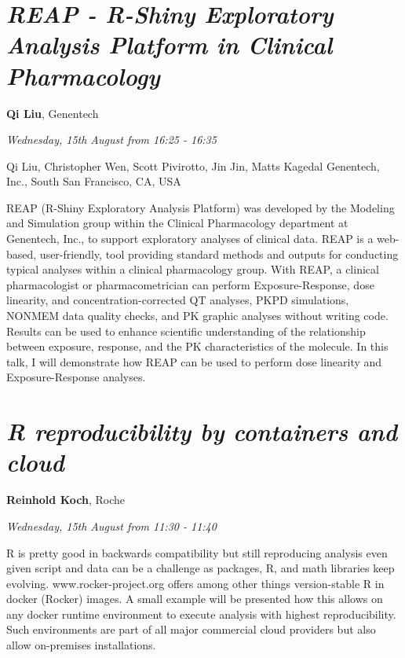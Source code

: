 \documentclass[]{book}
\theoremstyle{definition}
\theoremstyle{definition}
\theoremstyle{definition}
\theoremstyle{remark}
\begin{document}
\hypertarget{reap---r-shiny-exploratory-analysis-platform-in-clinical-pharmacology}{%
\section{\texorpdfstring{\emph{REAP - R-Shiny Exploratory Analysis
Platform in Clinical
Pharmacology}}{REAP - R-Shiny Exploratory Analysis Platform in Clinical Pharmacology}}\label{reap---r-shiny-exploratory-analysis-platform-in-clinical-pharmacology}}

\textbf{Qi Liu}, Genentech

\emph{Wednesday, 15th August from 16:25 - 16:35}

Qi Liu, Christopher Wen, Scott Pivirotto, Jin Jin, Matts Kagedal
Genentech, Inc., South San Francisco, CA, USA

REAP (R-Shiny Exploratory Analysis Platform) was developed by the
Modeling and Simulation group within the Clinical Pharmacology
department at Genentech, Inc., to support exploratory analyses of
clinical data. REAP is a web-based, user-friendly, tool providing
standard methods and outputs for conducting typical analyses within a
clinical pharmacology group. With REAP, a clinical pharmacologist or
pharmacometrician can perform Exposure-Response, dose linearity, and
concentration-corrected QT analyses, PKPD simulations, NONMEM data
quality checks, and PK graphic analyses without writing code. Results
can be used to enhance scientific understanding of the relationship
between exposure, response, and the PK characteristics of the molecule.
In this talk, I will demonstrate how REAP can be used to perform dose
linearity and Exposure-Response analyses.

\hypertarget{r-reproducibility-by-containers-and-cloud}{%
\section{\texorpdfstring{\emph{R reproducibility by containers and
cloud}}{R reproducibility by containers and cloud}}\label{r-reproducibility-by-containers-and-cloud}}

\textbf{Reinhold Koch}, Roche

\emph{Wednesday, 15th August from 11:30 - 11:40}

R is pretty good in backwards compatibility but still reproducing
analysis even given script and data can be a challenge as packages, R,
and math libraries keep evolving. www.rocker-project.org offers among
other things version-stable R in docker (Rocker) images. A small example
will be presented how this allows on any docker runtime environment to
execute analysis with highest reproducibility. Such environments are
part of all major commercial cloud providers but also allow on-premises
installations.
\end{document}
